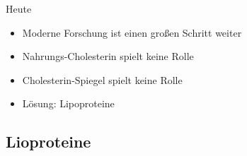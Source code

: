 \documentclass[xcolor=dvipsnames]{beamer}
\begin{document}
\begin{frame}[allowframebreaks]
        \framebreak

        \begin{block}{Heute}
            \begin{itemize}
                \setlength\itemsep{1em}
                \item Moderne Forschung ist einen großen Schritt weiter
                \item Nahrungs-Cholesterin spielt keine Rolle
                \item Cholesterin-Spiegel spielt keine Rolle
                \item Lösung: Lipoproteine
            \end{itemize}
        \end{block}
    \end{frame}

    \subsection{Lioproteine}
\end{document}
